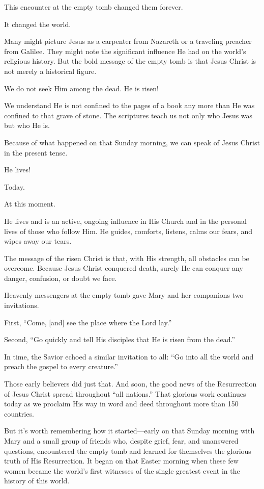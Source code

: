 \documentclass[letterpaper, 11pt]{report}
\newcommand{\intalkheader}[1]{
    \vspace{0.75em}
    \noindent{\normalsize\bfseries #1}
    \par\nopagebreak %
    \vspace{0.25em}
    \nopagebreak     %
}
\begin{document}
This encounter at the empty tomb changed them forever.

It changed the world.

\intalkheader{He Lives!}

Many might picture Jesus as a carpenter from Nazareth or a traveling preacher from Galilee. They might note the significant influence He had on the world’s religious history. But the bold message of the empty tomb is that Jesus Christ is not merely a historical figure.

We do not seek Him among the dead. He is risen!

We understand He is not confined to the pages of a book any more than He was confined to that grave of stone. The scriptures teach us not only who Jesus was but who He is.

Because of what happened on that Sunday morning, we can speak of Jesus Christ in the present tense.

He lives!

Today.

At this moment.

He lives and is an active, ongoing influence in His Church and in the personal lives of those who follow Him. He guides, comforts, listens, calms our fears, and wipes away our tears.

The message of the risen Christ is that, with His strength, all obstacles can be overcome. Because Jesus Christ conquered death, surely He can conquer any danger, confusion, or doubt we face.

\intalkheader{The First Witnesses}

Heavenly messengers at the empty tomb gave Mary and her companions two invitations.

First, “Come, [and] see the place where the Lord lay.”

Second, “Go quickly and tell His disciples that He is risen from the dead.”

In time, the Savior echoed a similar invitation to all: “Go into all the world and preach the gospel to every creature.”

Those early believers did just that. And soon, the good news of the Resurrection of Jesus Christ spread throughout “all nations.” That glorious work continues today as we proclaim His way in word and deed throughout more than 150 countries.

\intalkheader{An Invitation}

But it’s worth remembering how it started—early on that Sunday morning with Mary and a small group of friends who, despite grief, fear, and unanswered questions, encountered the empty tomb and learned for themselves the glorious truth of His Resurrection. It began on that Easter morning when these few women became the world’s first witnesses of the single greatest event in the history of this world.
\end{document}
